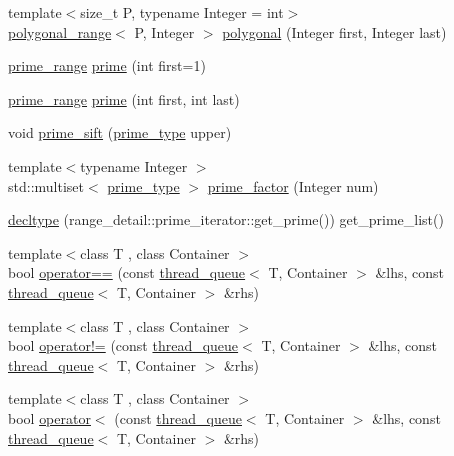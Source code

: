\begin{DoxyCompactItemize}
\item 
{\footnotesize template$<$size\-\_\-t \-P, typename Integer  = int$>$ }\\\hyperlink{classyuh_1_1polygonal__range}{polygonal\-\_\-range}$<$ \-P, \-Integer $>$ \hyperlink{namespaceyuh_a1af8d0faca38b0efb8ae71d0f773d3c8}{polygonal} (\-Integer first, \-Integer last)
\item 
\hyperlink{classyuh_1_1prime__range}{prime\-\_\-range} \hyperlink{namespaceyuh_ad0e08caa71b8e5172b1535657bbc0648}{prime} (int first=1)
\item 
\hyperlink{classyuh_1_1prime__range}{prime\-\_\-range} \hyperlink{namespaceyuh_a31e810e0c57ef83ca515b12f1aac0bf3}{prime} (int first, int last)
\item 
void \hyperlink{namespaceyuh_ac7fcc7fa46bf6b7cf12a53a653b23317}{prime\-\_\-sift} (\hyperlink{namespaceyuh_af542f8440602da42322ddb7ea8242336}{prime\-\_\-type} upper)
\item 
{\footnotesize template$<$typename Integer $>$ }\\std\-::multiset$<$ \hyperlink{namespaceyuh_af542f8440602da42322ddb7ea8242336}{prime\-\_\-type} $>$ \hyperlink{namespaceyuh_afb5d08e183729831f760d6c2a27226d8}{prime\-\_\-factor} (\-Integer num)
\item 
\hyperlink{namespaceyuh_aef8d22260a5c6af5f37d206badfd3d4e}{decltype} (range\-\_\-detail\-::prime\-\_\-iterator\-::get\-\_\-prime()) get\-\_\-prime\-\_\-list()
\item 
{\footnotesize template$<$class T , class Container $>$ }\\bool \hyperlink{namespaceyuh_a421c2841854b1b12fc7b0d52949db27c}{operator==} (const \hyperlink{classyuh_1_1thread__queue}{thread\-\_\-queue}$<$ \-T, \-Container $>$ \&lhs, const \hyperlink{classyuh_1_1thread__queue}{thread\-\_\-queue}$<$ \-T, \-Container $>$ \&rhs)
\item 
{\footnotesize template$<$class T , class Container $>$ }\\bool \hyperlink{namespaceyuh_a48b3691ecd13037fbba83d342e372dc9}{operator!=} (const \hyperlink{classyuh_1_1thread__queue}{thread\-\_\-queue}$<$ \-T, \-Container $>$ \&lhs, const \hyperlink{classyuh_1_1thread__queue}{thread\-\_\-queue}$<$ \-T, \-Container $>$ \&rhs)
\item 
{\footnotesize template$<$class T , class Container $>$ }\\bool \hyperlink{namespaceyuh_a8be12521082844890227cb3244ef0f9d}{operator$<$} (const \hyperlink{classyuh_1_1thread__queue}{thread\-\_\-queue}$<$ \-T, \-Container $>$ \&lhs, const \hyperlink{classyuh_1_1thread__queue}{thread\-\_\-queue}$<$ \-T, \-Container $>$ \&rhs)

\end{DoxyCompactItemize}
